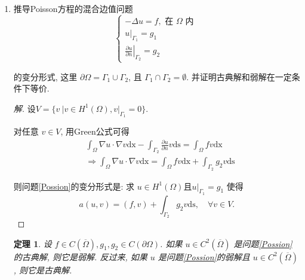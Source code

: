 \documentclass[12pt,a4paper]{article}
\newtheorem{theorem}{定理}
\begin{document}
\begin{enumerate}
\begin{proof}
			其中
			$$
			g(x) = \begin{cases}1, & 0<x<1 \\ -1, & -1<x<0\end{cases}
			$$
			
			显然$g$是局部Lesbegue可积函数,故$g$是$f$的一阶广义导数.
		\end{proof}
		
		\item 推导Poisson方程的混合边值问题
		\begin{equation} 
			\left\{\begin{array}{l}
				-\Delta u=f, \text { 在 } \Omega \text { 内 } \\
				\left.u\right|_{\Gamma_1}=g_1 \\
				\left.\frac{\partial u}{\partial n}\right|_{\Gamma_2}=g_2
			\end{array}\right. \label{Possion}
		\end{equation}
		
		
		
		的变分形式, 这里 $\partial \Omega=\Gamma_1 \cup \Gamma_2$, 且 $\Gamma_1 \cap \Gamma_2=\emptyset$. 并证明古典解和弱解在一定条件下等价.
		
		\begin{proof}[解]\let\qed\relax
			设$V = \{v\ | v \in H^1(\Omega), \left.v\right|_{\Gamma_1} = 0\}$.
			
			对任意 $v \in V$, 用Green公式可得
			$$
			\begin{aligned}
				& \int_{\Omega} \nabla u \cdot \nabla v \mathrm{dx}-\int_{\Gamma_2} \frac{\partial u}{\partial n} v \mathrm{ds}=\int_{\Omega} f v \mathrm{dx} \\
				& \Rightarrow \int_{\Omega} \nabla u \cdot \nabla v \mathrm{dx}=\int_{\Omega} f v \mathrm{dx}+\int_{\Gamma_2} g_2 v \mathrm{ds}
			\end{aligned}
			$$
			
			则问题\eqref{Possion}的变分形式是: 求 $u \in H^1(\Omega)$且$\left.u\right|_{\Gamma_1} = g_1$ 使得
			\begin{equation}
				a(u, v)=(f, v)+\int_{\Gamma_2} g_2 v \mathrm{ds}, \quad \forall v \in V.
				\label{weak}
			\end{equation}
			
			
			
		\end{proof}
		
		\begin{theorem}
			设 $f \in C(\overline{\Omega}), g_1,g_2  \in C(\partial \Omega)$. 如果 $u \in C^2(\overline{\Omega})$ 是问题\eqref{Possion}的古典解, 则它是弱解. 反过来, 如果 $u$ 是问题\eqref{Possion}的弱解且 $u \in C^2(\overline{\Omega})$, 则它是古典解.
		\end{theorem}
		

\end{enumerate}
\end{document}
